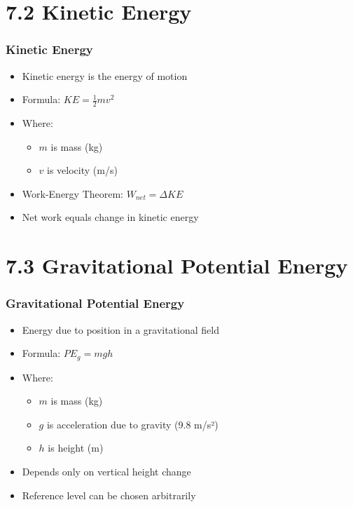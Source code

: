 \documentclass{beamer}
\begin{document}
\section{7.2 Kinetic Energy}

\begin{frame}
\frametitle{Kinetic Energy}
\begin{itemize}
    \item Kinetic energy is the energy of motion
    \pause
    \item Formula: $KE = \frac{1}{2}mv^2$
    \pause
    \item Where:
    \begin{itemize}
        \item $m$ is mass (kg)
        \pause
        \item $v$ is velocity (m/s)
    \end{itemize}
    \pause
    \item Work-Energy Theorem: $W_{net} = \Delta KE$
    \pause
    \item Net work equals change in kinetic energy
\end{itemize}
\end{frame}

\section{7.3 Gravitational Potential Energy}

\begin{frame}
\frametitle{Gravitational Potential Energy}
\begin{itemize}
    \item Energy due to position in a gravitational field
    \pause
    \item Formula: $PE_g = mgh$
    \pause
    \item Where:
    \begin{itemize}
        \item $m$ is mass (kg)
        \pause
        \item $g$ is acceleration due to gravity (9.8 m/s²)
        \pause
        \item $h$ is height (m)
    \end{itemize}
    \pause
    \item Depends only on vertical height change
    \pause
    \item Reference level can be chosen arbitrarily
\end{itemize}
\end{frame}
\end{document}
